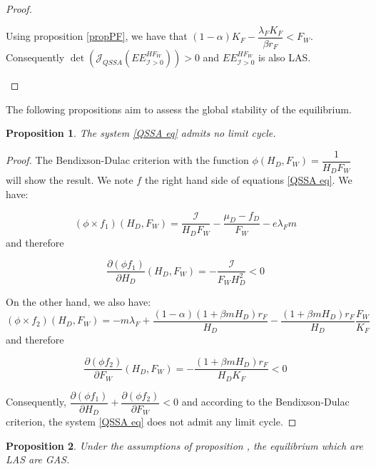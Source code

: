 \documentclass{article}
\newcommand{\lfw}{\lambda_{F}}
\newcommand{\lfw}{\lambda_{F}}
\newcommand{\cI}{\mathcal{I}}
\newtheorem{prop}{Proposition}
\begin{document}
\begin{proof}
\begin{itemize}
Using proposition \ref{propPF}, we have that $(1-\alpha)K_F - \dfrac{\lfw K_F}{\beta r_F} < F_W$. Consequently $\det(\mathcal{J}_{QSSA}(EE^{HF_W}_{\cI > 0})) > 0$ and $EE^{HF_W}_{\cI > 0}$ is also LAS.
\end{itemize}

\end{proof}

The following propositions aim to assess the global stability of the equilibrium.

\begin{prop}
The system \eqref{QSSA eq} admits no limit cycle.
\end{prop}

\begin{proof}
The Bendixson-Dulac criterion with the function $\phi(H_D, F_W) = \dfrac{1}{H_D F_W}$ will show the result. We note $f$ the right hand side of equations \eqref{QSSA eq}. We have:

\begin{equation*}
(\phi \times f_1)(H_D, F_W) = \dfrac{\cI}{H_D F_W} -\dfrac{\mu_D - f_D}{F_W} - e\lfw m
\end{equation*} and therefore

\begin{equation*}
\dfrac{\partial (\phi f_1)}{\partial H_D}(H_D, F_W) = - \dfrac{\cI}{F_W H_D^2} <0
\end{equation*}

On the other hand, we also have:
\begin{equation*}
(\phi \times f_2)(H_D, F_W) = - m \lfw + \dfrac{(1-\alpha) (1+ \beta m H_D) r_F}{H_D} - \dfrac{(1+\beta m H_D) r_F}{H_D} \dfrac{F_W}{K_F}
\end{equation*} and therefore

\begin{equation*}
\dfrac{\partial (\phi f_2)}{\partial F_W}(H_D, F_W) = - \dfrac{(1+\beta m H_D) r_F}{H_D K_F} <0
\end{equation*}

Consequently, $\dfrac{\partial (\phi f_1)}{\partial H_D} + \dfrac{\partial (\phi f_2)}{\partial F_W} < 0$ and according to the Bendixson-Dulac criterion, the system \eqref{QSSA eq} does not admit any limit cycle.

\end{proof}


\begin{prop}
Under the assumptions of proposition , the equilibrium which are LAS are GAS.
\end{prop}
\end{document}
